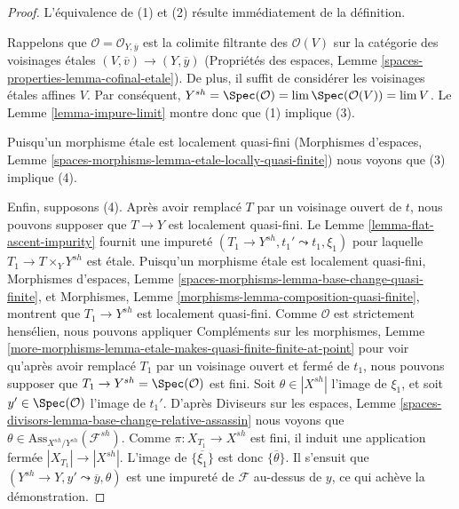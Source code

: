 \begin{proof}
L'équivalence de (1) et (2) résulte immédiatement de la définition.

\medskip\noindent
Rappelons que $\mathcal{O} = \mathcal{O}_{Y, \overline{y}}$
est la colimite filtrante des $\mathcal{O}(V)$ sur la catégorie
des voisinages \'etales $(V, \overline{v}) \to (Y, \overline{y})$
(Propriétés des espaces, Lemme \ref{spaces-properties-lemma-cofinal-etale}).
De plus, il suffit de considérer les voisinages \'etales affines $V$.
Par conséquent, $Y^{sh} = \Spec(\mathcal{O}) = \lim \Spec(\mathcal{O}(V)) = \lim V$.
Le Lemme \ref{lemma-impure-limit} montre donc que (1) implique (3).

\medskip\noindent
Puisqu'un morphisme \'etale est localement quasi-fini
(Morphismes d'espaces, Lemme
\ref{spaces-morphisms-lemma-etale-locally-quasi-finite})
nous voyons que (3) implique (4).

\medskip\noindent
Enfin, supposons (4). Après avoir remplacé $T$ par un voisinage ouvert de $t$,
nous pouvons supposer que $T \to Y$ est localement quasi-fini.
Le Lemme \ref{lemma-flat-ascent-impurity}
fournit une impureté
$(T_1 \to Y^{sh}, t_1' \leadsto t_1, \xi_1)$
pour laquelle $T_1 \to T \times_Y Y^{sh}$ est
\'etale. Puisqu'un morphisme \'etale est localement quasi-fini,
Morphismes d'espaces, Lemme
\ref{spaces-morphisms-lemma-base-change-quasi-finite}, et
Morphismes, Lemme \ref{morphisms-lemma-composition-quasi-finite},
montrent que $T_1 \to Y^{sh}$ est localement quasi-fini.
Comme $\mathcal{O}$ est strictement hensélien, nous pouvons appliquer Compléments sur les morphismes, Lemme
\ref{more-morphisms-lemma-etale-makes-quasi-finite-finite-at-point}
pour voir qu'après avoir remplacé $T_1$ par un voisinage ouvert et fermé
de $t_1$, nous pouvons supposer que $T_1 \to Y^{sh} = \Spec(\mathcal{O})$
est fini. Soit $\theta \in |X^{sh}|$ l'image de
$\xi_1$, et soit $y' \in \Spec(\mathcal{O})$ l'image
de $t_1'$. D'après Diviseurs sur les espaces, Lemme
\ref{spaces-divisors-lemma-base-change-relative-assassin}
nous voyons que $\theta \in \text{Ass}_{X^{sh}/Y^{sh}}(\mathcal{F}^{sh})$.
Comme $\pi : X_{T_1} \to X^{sh}$
est fini, il induit une application fermée $|X_{T_1}| \to |X^{sh}|$.
L'image de $\overline{\{\xi_1\}}$ est donc $\overline{\{\theta\}}$.
Il s'ensuit que $(Y^{sh} \to Y, y' \leadsto \overline{y}, \theta)$
est une impureté de $\mathcal{F}$ au-dessus de $y$, ce qui achève la démonstration.
\end{proof}








